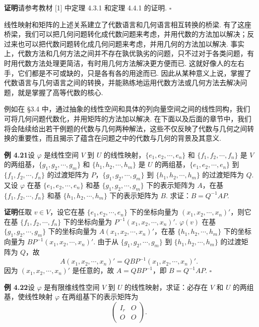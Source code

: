 \documentclass[UTF8, 12pt, fontset=fandol, oneside]{ctexart}
\begin{document}
\noindent\textbf{证明}\quad 请参考教材 [1] 中定理 4.3.1 和定理 4.4.1 的证明. $\square$

线性映射和矩阵的上述关系建立了代数语言和几何语言相互转换的桥梁. 有了这座桥梁，我们可以把几何问题转化成代数问题来考虑，并用代数的方法加以解决；反过来也可以把代数问题转化成几何问题来考虑，并用几何的方法加以解决. 事实上，代数方法和几何方法之间并不存在孰优孰劣的问题，只不过对于各类问题，有时用代数方法处理更简洁，有时用几何方法解决更方便而已. 这就好像人的左右手，它们都是不可或缺的，只是各有各的用途而已. 因此从某种意义上说，掌握了代数语言与几何语言之间的转换，并能熟练地运用代数方法或几何方法去解决问题，就是掌握了高等代数的核心.

例如在 §3.4 中，通过抽象的线性空间和具体的列向量空间之间的线性同构，我们可将几何问题代数化，并用矩阵的方法加以解决. 在下面以及后面的章节中，我们将会陆续给出若干例题的代数与几何两种解法，这些不仅反映了代数与几何之间转换的重要性，而且揭示了蕴含在问题之中的代数与几何的背景及其意义.

\noindent\textbf{例 4.21}\quad 设 $\varphi$ 是线性空间 $V$ 到 $U$ 的线性映射，$\{e_1,e_2,\cdots,e_n\}$ 和 $\{f_1,f_2,\cdots,f_n\}$ 是 $V$ 的两组基，$\{g_1,g_2,\cdots,g_m\}$ 和 $\{h_1,h_2,\cdots,h_m\}$ 是 $U$ 的两组基，$\{e_1,e_2,\cdots,e_n\}$ 到 $\{f_1,f_2,\cdots,f_n\}$ 的过渡矩阵为 $P$，$\{g_1,g_2,\cdots,g_m\}$ 到 $\{h_1,h_2,\cdots,h_m\}$ 的过渡矩阵为 $Q$. 又设 $\varphi$ 在基 $\{e_1,e_2,\cdots,e_n\}$ 和基 $\{g_1,g_2,\cdots,g_m\}$ 下的表示矩阵为 $A$，在基 $\{f_1,f_2,\cdots,f_n\}$ 和基 $\{h_1,h_2,\cdots,h_m\}$ 下的表示矩阵为 $B$. 求证：$B=Q^{-1}AP$.

\noindent\textbf{证明}\quad 任取 $v\in V$，设它在基 $\{e_1,e_2,\cdots,e_n\}$ 下的坐标向量为 $(x_1,x_2,\cdots,x_n)'$，则它在基 $\{f_1,f_2,\cdots,f_n\}$ 下的坐标向量为 $P^{-1}(x_1,x_2,\cdots,x_n)'$. $\varphi(v)$ 在基 $\{g_1,g_2,\cdots,g_m\}$ 下的坐标向量为 $A(x_1,x_2,\cdots,x_n)'$，在基 $\{h_1,h_2,\cdots,h_m\}$ 下的坐标向量为 $BP^{-1}(x_1,x_2,\cdots,x_n)'$. 由于从 $\{g_1,g_2,\cdots,g_m\}$ 到 $\{h_1,h_2,\cdots,h_m\}$ 的过渡矩阵为 $Q$，故
\[
A(x_1,x_2,\cdots,x_n)'=QBP^{-1}(x_1,x_2,\cdots,x_n)'.
\]
因为 $(x_1,x_2,\cdots,x_n)'$ 是任意的，故 $A=QBP^{-1}$，即 $B=Q^{-1}AP$. $\square$

\noindent\textbf{例 4.22}\quad 设 $\varphi$ 是有限维线性空间 $V$ 到 $U$ 的线性映射，求证：必存在 $V$ 和 $U$ 的两组基，使线性映射 $\varphi$ 在两组基下的表示矩阵为
\[
\left(\begin{array}{cc}
I_r & O\\
O & O
\end{array}\right).
\]
\end{document}
